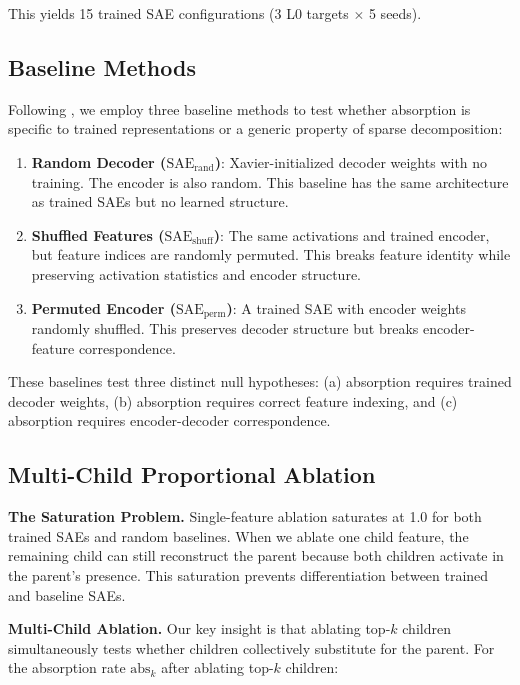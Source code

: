 \documentclass{article}
\begin{document}
This yields 15 trained SAE configurations (3 L0 targets $\times$ 5 seeds).

\subsection{Baseline Methods}

Following \citet{korznikov2026}, we employ three baseline methods to test whether absorption is specific to trained representations or a generic property of sparse decomposition:

\begin{enumerate}
\item \textbf{Random Decoder ($\text{SAE}_{\text{rand}}$)}: Xavier-initialized decoder weights with no training. The encoder is also random. This baseline has the same architecture as trained SAEs but no learned structure.

\item \textbf{Shuffled Features ($\text{SAE}_{\text{shuff}}$)}: The same activations and trained encoder, but feature indices are randomly permuted. This breaks feature identity while preserving activation statistics and encoder structure.

\item \textbf{Permuted Encoder ($\text{SAE}_{\text{perm}}$)}: A trained SAE with encoder weights randomly shuffled. This preserves decoder structure but breaks encoder-feature correspondence.
\end{enumerate}

These baselines test three distinct null hypotheses: (a) absorption requires trained decoder weights, (b) absorption requires correct feature indexing, and (c) absorption requires encoder-decoder correspondence.

\subsection{Multi-Child Proportional Ablation}

\textbf{The Saturation Problem.} Single-feature ablation saturates at 1.0 for both trained SAEs and random baselines. When we ablate one child feature, the remaining child can still reconstruct the parent because both children activate in the parent's presence. This saturation prevents differentiation between trained and baseline SAEs.

\textbf{Multi-Child Ablation.} Our key insight is that ablating top-$k$ children simultaneously tests whether children collectively substitute for the parent. For the absorption rate $\text{abs}_k$ after ablating top-$k$ children:
\end{document}
